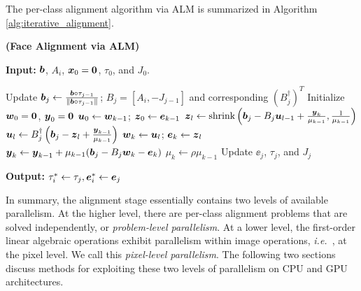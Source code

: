 \documentclass[preprint]{sigplanconf}
\def\ie{\emph{i.e.\ }}
\begin{document}
The per-class alignment algorithm via ALM is summarized in Algorithm
\ref{alg:iterative_alignment}. 
\begin{algorithm}[ht!]
\caption{\bf (Face Alignment via ALM)} \label{alg:iterative_alignment}
\small
{\bf Input:} ${\boldsymbol{b}}$, $A_i$, ${\boldsymbol{x}}_0 = \boldsymbol{0}$, $\tau_0$, and $J_0$.
\begin{algorithmic}[1]
\STATE Update ${\boldsymbol{b}}_j \leftarrow \frac{{\boldsymbol{b}}\circ \tau_{j-1}}{\|{\boldsymbol{b}}\circ \tau_{j-1}\|}$; $B_j= [A_i, -J_{j-1}]$ and corresponding $(B_j^\dagger)^T$
\STATE Initialize ${\boldsymbol{w}}_0 = \boldsymbol 0$, ${\boldsymbol{y}}_0 = \boldsymbol 0$
\STATE ${\boldsymbol{u}}_0\leftarrow {\boldsymbol{w}}_{k-1}$; ${\boldsymbol{z}}_0\leftarrow {\boldsymbol{e}}_{k-1}$
\STATE ${\boldsymbol{z}}_l \leftarrow {\text{shrink}}\left({\boldsymbol{b}}_j - B_j{\boldsymbol{u}}_{l-1} + \frac{{\boldsymbol{y}}_{k}}{\mu_{k-1}}, \frac{1}{\mu_{k-1}}\right)$
\STATE ${\boldsymbol{u}}_l \leftarrow B_j^\dagger \left({\boldsymbol{b}}_j - {\boldsymbol{z}}_{l} + \frac{{\boldsymbol{y}}_{k-1}}{\mu_{k-1}} \right) $
\ENDWHILE
\STATE ${\boldsymbol{w}}_k \leftarrow {\boldsymbol{u}}_l$; ${\boldsymbol{e}}_k \leftarrow {\boldsymbol{z}}_l$
\STATE ${\boldsymbol{y}}_{k} \leftarrow {\boldsymbol{y}}_{k-1} + \mu_{k-1} ({\boldsymbol{b}}_j - B_j{\boldsymbol{w}}_{k} - \boldsymbol{e}_{k})$
\STATE $\mu_{k} \leftarrow \rho\mu_{k-1}$
\ENDWHILE
\STATE Update $\ee_j$, $\tau_j$, and $J_j$
\ENDWHILE
\end{algorithmic}
{\bf Output:} $\tau_i^*\leftarrow \tau_j, \boldsymbol{e}_i^*\leftarrow {\boldsymbol{e}}_j$
\end{algorithm}

In summary, the alignment stage essentially contains two levels of available
parallelism. At the higher level, there are per-class alignment problems
that are solved independently, or \emph{problem-level parallelism}.  At a lower
level, the first-order linear algebraic operations exhibit parallelism within
image operations, \ie, at the pixel level.  We call this \emph{pixel-level
parallelism}.  The following two sections discuss methods for exploiting
these two levels of parallelism on CPU and GPU architectures.
\end{document}
